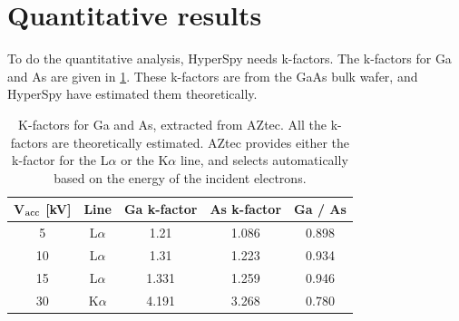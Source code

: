 \section{Quantitative results}
\label{sec:results:quantification}





To do the quantitative analysis, HyperSpy needs k-factors.
The k-factors for Ga and As are given in \cref{tab:results:k-factors}.
These k-factors are from the GaAs bulk wafer, and HyperSpy have estimated them theoretically.

\begin{table}[h]
    \centering
    \caption{
        K-factors for Ga and As, extracted from AZtec.
        All the k-factors are theoretically estimated.
        AZtec provides either the k-factor for the L$\alpha$ or the K$\alpha$ line, and selects automatically based on the energy of the incident electrons.
    }
    \label{tab:results:k-factors}
    \begin{tabular}{ccccc}
        V$_\textnormal{acc}$ [kV] & Line      & Ga k-factor & As k-factor & Ga / As \\
        \hline
        5                         & L$\alpha$ & 1.21        & 1.086       & 0.898   \\
        10                        & L$\alpha$ & 1.31        & 1.223       & 0.934   \\
        15                        & L$\alpha$ & 1.331       & 1.259       & 0.946   \\
        30                        & K$\alpha$ & 4.191       & 3.268       & 0.780
    \end{tabular}
\end{table}

